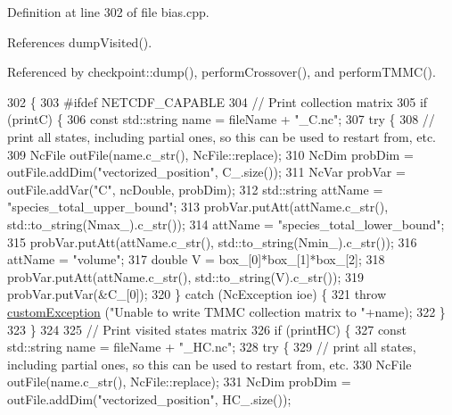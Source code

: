 Definition at line 302 of file bias.\-cpp.



References dump\-Visited().



Referenced by checkpoint\-::dump(), perform\-Crossover(), and perform\-T\-M\-M\-C().


\begin{DoxyCode}
302                                                                      \{
303 \textcolor{preprocessor}{#ifdef NETCDF\_CAPABLE}
304 \textcolor{preprocessor}{}    \textcolor{comment}{// Print collection matrix}
305     \textcolor{keywordflow}{if} (printC) \{
306         \textcolor{keyword}{const} std::string name = fileName + \textcolor{stringliteral}{"\_C.nc"};
307         \textcolor{keywordflow}{try} \{
308             \textcolor{comment}{// print all states, including partial ones, so this can be used to restart from, etc.}
309             NcFile outFile(name.c\_str(), NcFile::replace);
310             NcDim probDim = outFile.addDim(\textcolor{stringliteral}{"vectorized\_position"}, C\_.size());
311             NcVar probVar = outFile.addVar(\textcolor{stringliteral}{"C"}, ncDouble, probDim);
312             std::string attName = \textcolor{stringliteral}{"species\_total\_upper\_bound"};
313             probVar.putAtt(attName.c\_str(), std::to\_string(Nmax\_).c\_str());
314             attName = \textcolor{stringliteral}{"species\_total\_lower\_bound"};
315             probVar.putAtt(attName.c\_str(), std::to\_string(Nmin\_).c\_str());
316             attName = \textcolor{stringliteral}{"volume"};
317             \textcolor{keywordtype}{double} V = box\_[0]*box\_[1]*box\_[2];
318             probVar.putAtt(attName.c\_str(), std::to\_string(V).c\_str());
319             probVar.putVar(&C\_[0]);
320         \} \textcolor{keywordflow}{catch} (NcException ioe) \{
321             \textcolor{keywordflow}{throw} \hyperlink{classcustom_exception}{customException} (\textcolor{stringliteral}{"Unable to write TMMC collection matrix to "}+name);
322         \}
323     \}
324 
325     \textcolor{comment}{// Print visited states matrix}
326     \textcolor{keywordflow}{if} (printHC) \{
327         \textcolor{keyword}{const} std::string name = fileName + \textcolor{stringliteral}{"\_HC.nc"};
328         \textcolor{keywordflow}{try} \{
329             \textcolor{comment}{// print all states, including partial ones, so this can be used to restart from, etc.}
330             NcFile outFile(name.c\_str(), NcFile::replace);
331             NcDim probDim = outFile.addDim(\textcolor{stringliteral}{"vectorized\_position"}, HC\_.size());

\end{DoxyCode}

